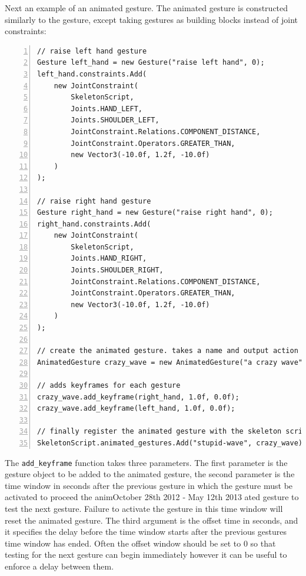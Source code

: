 \documentclass[a4paper,oneside]{memoir}
\begin{document}
			Next an example of an animated gesture.
			The animated gesture is constructed similarly to the gesture, except taking gestures as building blocks instead of joint constraints:

			\begin{lstlisting}[language=CSharp,numbers=left,morekeywords={Joints,JointConstraint,Gesture,AnimatedGesture}]
// raise left hand gesture
Gesture left_hand = new Gesture("raise left hand", 0);
left_hand.constraints.Add(
	new JointConstraint(
		SkeletonScript,
		Joints.HAND_LEFT,
		Joints.SHOULDER_LEFT,
		JointConstraint.Relations.COMPONENT_DISTANCE,
		JointConstraint.Operators.GREATER_THAN,
		new Vector3(-10.0f, 1.2f, -10.0f)
	)
);

// raise right hand gesture
Gesture right_hand = new Gesture("raise right hand", 0);
right_hand.constraints.Add(
	new JointConstraint(
		SkeletonScript,
		Joints.HAND_RIGHT,
		Joints.SHOULDER_RIGHT,
		JointConstraint.Relations.COMPONENT_DISTANCE,
		JointConstraint.Operators.GREATER_THAN,
		new Vector3(-10.0f, 1.2f, -10.0f)
	)
);

// create the animated gesture. takes a name and output action code as parameters
AnimatedGesture crazy_wave = new AnimatedGesture("a crazy wave", 2);

// adds keyframes for each gesture
crazy_wave.add_keyframe(right_hand, 1.0f, 0.0f);
crazy_wave.add_keyframe(left_hand, 1.0f, 0.0f);

// finally register the animated gesture with the skeleton script associated with the player.
SkeletonScript.animated_gestures.Add("stupid-wave", crazy_wave);
			\end{lstlisting}

			The \texttt{add\_keyframe} function takes three parameters.
			The first parameter is the gesture object to be added to the animated gesture, the second parameter is the time window in seconds after the previous gesture in which the gesture must be activated to proceed the animOctober 28th 2012 ‐ May 12th 2013 ated gesture to test the next gesture.
			Failure to activate the gesture in this time window will reset the animated gesture.
			The third argument is the offset time in seconds, and it specifies the delay before the time window starts after the previous gestures time window has ended.
			Often the offset window should be set to 0 so that testing for the next gesture can begin immediately however it can be useful to enforce a delay between them.
\end{document}
